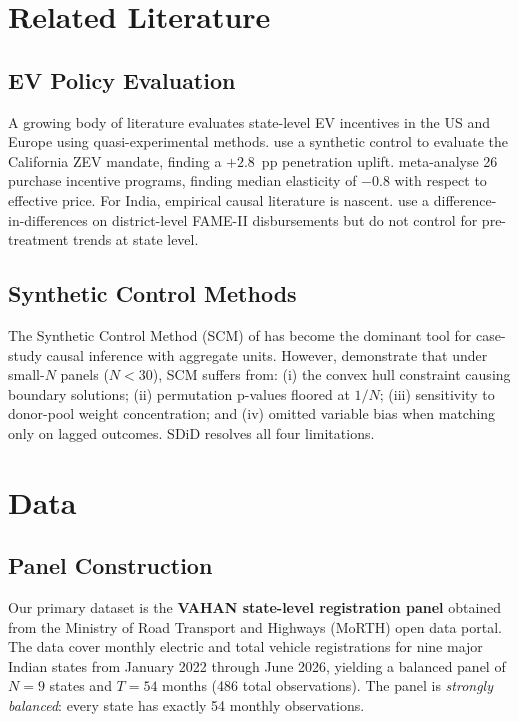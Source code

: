 \documentclass[journal]{IEEEtran}
\begin{document}
\section{Related Literature}
\label{sec:lit}

\subsection{EV Policy Evaluation}
A growing body of literature evaluates state-level EV incentives in the US
and Europe using quasi-experimental methods. \citet{Muehlegger2022} use a
synthetic control to evaluate the California ZEV mandate, finding a 
$+2.8$~pp penetration uplift. \citet{Hardman2021} meta-analyse 
26 purchase incentive programs, finding median elasticity of 
$-0.8$ with respect to effective price. For India, empirical causal
literature is nascent. \citet{Chakraborty2023} use a difference-in-differences
on district-level FAME-II disbursements but do not control for
pre-treatment trends at state level.

\subsection{Synthetic Control Methods}
The Synthetic Control Method (SCM) of \citet{Abadie2010, Abadie2015} 
has become the dominant tool for case-study causal inference with aggregate
units. However, \citet{Arkhangelsky2021} demonstrate that under 
small-$N$ panels ($N < 30$), SCM suffers from: (i) the convex hull 
constraint causing boundary solutions; (ii) permutation p-values floored at 
$1/N$; (iii) sensitivity to donor-pool weight concentration; and (iv) 
omitted variable bias when matching only on lagged outcomes. SDiD resolves 
all four limitations.

\section{Data}
\label{sec:data}

\subsection{Panel Construction}
Our primary dataset is the \textbf{VAHAN state-level registration panel}
obtained from the Ministry of Road Transport and Highways (MoRTH) open
data portal. The data cover monthly electric and total vehicle 
registrations for nine major Indian states from January 2022 through
June 2026, yielding a balanced panel of $N = 9$ states and $T = 54$
months (486 total observations). The panel is \emph{strongly balanced}: 
every state has exactly 54 monthly observations.
\end{document}

